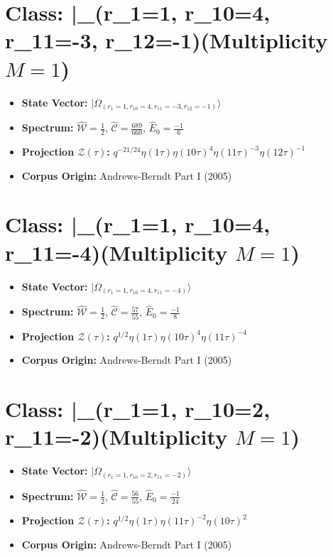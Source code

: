 \documentclass[11pt,twoside,openright]{book}
\begin{document}
\section*{Class: |\Omega_{(r_{1}=1, r_{10}=4, r_{11}=-3, r_{12}=-1)}\rangle (Multiplicity $M=1$)}
\begin{itemize}
  \item \textbf{State Vector:} $|\Omega_{(r_{1}=1, r_{10}=4, r_{11}=-3, r_{12}=-1)}\rangle$
  \item \textbf{Spectrum:} $\hat{\mathcal{W}} = \frac{1}{2}$, $\hat{\mathcal{C}} = \frac{689}{660}$, $\hat{E}_0 = \frac{-1}{6}$
  \item \textbf{Projection $\mathcal{Z}(\tau)$:} $q^{-21/24} \eta(1\tau) \eta(10\tau)^{4} \eta(11\tau)^{-3} \eta(12\tau)^{-1}$
  \item \textbf{Corpus Origin:} Andrews-Berndt Part I (2005)
\end{itemize}

\section*{Class: |\Omega_{(r_{1}=1, r_{10}=4, r_{11}=-4)}\rangle (Multiplicity $M=1$)}
\begin{itemize}
  \item \textbf{State Vector:} $|\Omega_{(r_{1}=1, r_{10}=4, r_{11}=-4)}\rangle$
  \item \textbf{Spectrum:} $\hat{\mathcal{W}} = \frac{1}{2}$, $\hat{\mathcal{C}} = \frac{57}{55}$, $\hat{E}_0 = \frac{-1}{8}$
  \item \textbf{Projection $\mathcal{Z}(\tau)$:} $q^{1/2} \eta(1\tau) \eta(10\tau)^{4} \eta(11\tau)^{-4}$
  \item \textbf{Corpus Origin:} Andrews-Berndt Part I (2005)
\end{itemize}

\section*{Class: |\Omega_{(r_{1}=1, r_{10}=2, r_{11}=-2)}\rangle (Multiplicity $M=1$)}
\begin{itemize}
  \item \textbf{State Vector:} $|\Omega_{(r_{1}=1, r_{10}=2, r_{11}=-2)}\rangle$
  \item \textbf{Spectrum:} $\hat{\mathcal{W}} = \frac{1}{2}$, $\hat{\mathcal{C}} = \frac{56}{55}$, $\hat{E}_0 = \frac{-1}{24}$
  \item \textbf{Projection $\mathcal{Z}(\tau)$:} $q^{1/2} \eta(1\tau) \eta(11\tau)^{-2} \eta(10\tau)^{2}$
  \item \textbf{Corpus Origin:} Andrews-Berndt Part I (2005)
\end{itemize}
\end{document}
